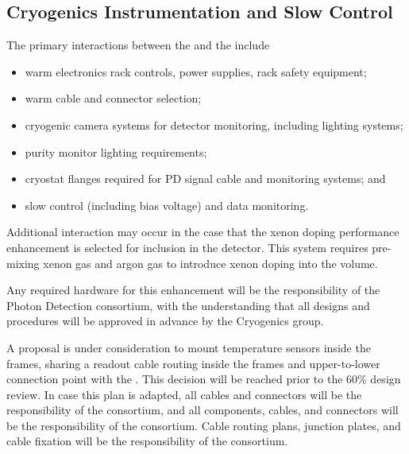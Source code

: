 \subsection{Cryogenics Instrumentation and Slow Control}
\label{sec:fdsp-pd-intfc-xeon}

The primary interactions between the  and the  include

\begin{itemize}
    \item warm electronics rack controls, power supplies, rack safety equipment;
    \item warm cable and connector selection;
    \item cryogenic camera systems for detector monitoring, including lighting systems;
    \item purity monitor lighting requirements;
    \item cryostat flanges required for PD signal cable and monitoring systems; and
    \item {} slow control (including bias voltage) and data monitoring.
\end{itemize}

Additional interaction may occur in the case that the xenon doping performance enhancement is selected for inclusion in the detector.  This system requires pre-mixing xenon gas and argon gas to introduce xenon doping into the \lar volume. 


Any required hardware for this enhancement will be the responsibility of the Photon Detection consortium, with the understanding that all designs and procedures will be approved in advance by the Cryogenics group. 


A proposal is under consideration to mount  temperature sensors inside the  frames, sharing a readout cable routing inside the  frames and upper-to-lower  connection point with the .  This decision will be reached prior to the 60\% design review.  In case this plan is adapted, all  cables and connectors will be the responsibility of the  consortium, and all  components, cables, and connectors will be the responsibility of the  consortium.  Cable routing plans, junction plates, and cable fixation will be the responsibility of the  consortium.

